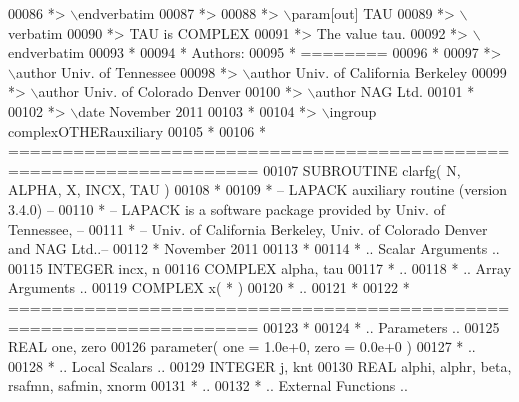 \begin{DoxyCode}
00086 \textcolor{comment}{*> \(\backslash\)endverbatim}
00087 \textcolor{comment}{*>}
00088 \textcolor{comment}{*> \(\backslash\)param[out] TAU}
00089 \textcolor{comment}{*> \(\backslash\)verbatim}
00090 \textcolor{comment}{*>          TAU is COMPLEX}
00091 \textcolor{comment}{*>          The value tau.}
00092 \textcolor{comment}{*> \(\backslash\)endverbatim}
00093 \textcolor{comment}{*}
00094 \textcolor{comment}{*  Authors:}
00095 \textcolor{comment}{*  ========}
00096 \textcolor{comment}{*}
00097 \textcolor{comment}{*> \(\backslash\)author Univ. of Tennessee }
00098 \textcolor{comment}{*> \(\backslash\)author Univ. of California Berkeley }
00099 \textcolor{comment}{*> \(\backslash\)author Univ. of Colorado Denver }
00100 \textcolor{comment}{*> \(\backslash\)author NAG Ltd. }
00101 \textcolor{comment}{*}
00102 \textcolor{comment}{*> \(\backslash\)date November 2011}
00103 \textcolor{comment}{*}
00104 \textcolor{comment}{*> \(\backslash\)ingroup complexOTHERauxiliary}
00105 \textcolor{comment}{*}
00106 \textcolor{comment}{*  =====================================================================}
00107 \textcolor{keyword}{      SUBROUTINE }clarfg( N, ALPHA, X, INCX, TAU )
00108 \textcolor{comment}{*}
00109 \textcolor{comment}{*  -- LAPACK auxiliary routine (version 3.4.0) --}
00110 \textcolor{comment}{*  -- LAPACK is a software package provided by Univ. of Tennessee,    --}
00111 \textcolor{comment}{*  -- Univ. of California Berkeley, Univ. of Colorado Denver and NAG Ltd..--}
00112 \textcolor{comment}{*     November 2011}
00113 \textcolor{comment}{*}
00114 \textcolor{comment}{*     .. Scalar Arguments ..}
00115       \textcolor{keywordtype}{INTEGER}            incx, n
00116       \textcolor{keywordtype}{COMPLEX}            alpha, tau
00117 \textcolor{comment}{*     ..}
00118 \textcolor{comment}{*     .. Array Arguments ..}
00119       \textcolor{keywordtype}{COMPLEX}            x( * )
00120 \textcolor{comment}{*     ..}
00121 \textcolor{comment}{*}
00122 \textcolor{comment}{*  =====================================================================}
00123 \textcolor{comment}{*}
00124 \textcolor{comment}{*     .. Parameters ..}
00125       \textcolor{keywordtype}{REAL}               one, zero
00126       parameter( one = 1.0e+0, zero = 0.0e+0 )
00127 \textcolor{comment}{*     ..}
00128 \textcolor{comment}{*     .. Local Scalars ..}
00129       \textcolor{keywordtype}{INTEGER}            j, knt
00130       \textcolor{keywordtype}{REAL}               alphi, alphr, beta, rsafmn, safmin, xnorm
00131 \textcolor{comment}{*     ..}
00132 \textcolor{comment}{*     .. External Functions ..}

\end{DoxyCode}
